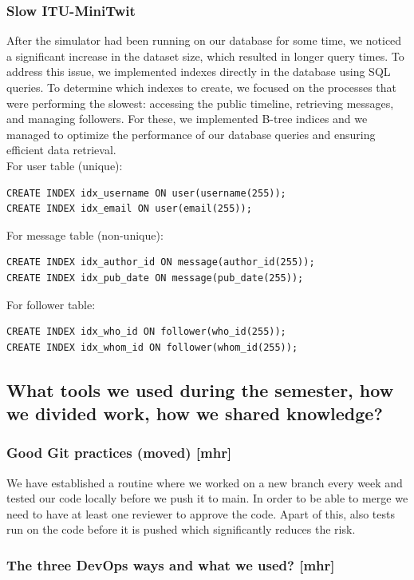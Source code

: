 \documentclass{article}
\begin{document}
\subsubsection{Slow ITU-MiniTwit}
After the simulator had been running on our database for some time, we noticed a significant increase in the dataset size, which resulted in longer query times. To address this issue, we implemented indexes directly in the database using SQL queries. To determine which indexes to create, we focused on the processes that were performing the slowest: accessing the public timeline, retrieving messages, and managing followers. For these, we implemented B-tree indices and we managed to optimize the performance of our database queries and ensuring efficient data retrieval.
\\
For user table (unique):
\begin{verbatim}
CREATE INDEX idx_username ON user(username(255));
CREATE INDEX idx_email ON user(email(255));
\end{verbatim}

For message table (non-unique):
\begin{verbatim}
CREATE INDEX idx_author_id ON message(author_id(255));
CREATE INDEX idx_pub_date ON message(pub_date(255));
\end{verbatim}

For follower table:
\begin{verbatim}
CREATE INDEX idx_who_id ON follower(who_id(255));
CREATE INDEX idx_whom_id ON follower(whom_id(255));
\end{verbatim}

\subsection{What tools we used during the semester, how we divided work, how we shared knowledge?}

\subsubsection{Good Git practices (moved) [mhr]}
We have established a routine where we worked on a new branch every week and tested our code locally before we push it to main. In order to be able to merge we need to have at least one reviewer to approve the code. Apart of this, also tests run on the code before it is pushed which significantly reduces the risk.

\subsubsection{The three DevOps ways and what we used? [mhr]} 
\end{document}
